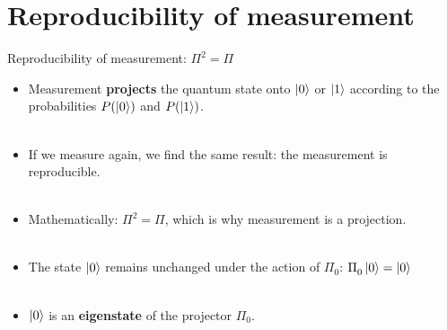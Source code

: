 \documentclass[aspectratio=169,12pt]{beamer}
\begin{document}
\section{Reproducibility of measurement}

\begin{frame}{Reproducibility of measurement: $\Pi^2 = \Pi$}
  \begin{itemize}[<+->]
    \setlength{\itemsep}{0.8em}
    \item Measurement \textbf{projects} the quantum state onto $\ket{0}$ or $\ket{1}$
     according to the probabilities $P(\ket 0)$ and $P(\ket 1)$.\\~\\
    \item If we measure again, we find the same result: the measurement is reproducible.\\~\\
    \item Mathematically: $\Pi^2 = \Pi$, which is why measurement is a projection.\\~\\
    \item The state $\ket 0$ remains unchanged under the action of $\Pi_0^{}$: $\Pi_0^{} \ket 0 = \ket 0$\\~\\ 
    \item $\ket 0$ is an \textbf{eigenstate} of the projector $\Pi_0^{}$.
  \end{itemize}
\end{frame}
\end{document}
